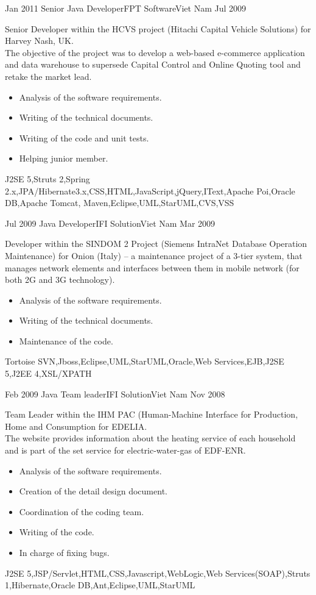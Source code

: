\begin{experiences}
\experience
  {Jan 2011}  {Senior Java Developer}{FPT Software}{Viet Nam}
  {Jul 2009}   {
Senior Developer within the HCVS project (Hitachi Capital Vehicle Solutions) for Harvey Nash, UK.\\
The objective of the project was to develop a web-based e-commerce application and data warehouse to supersede Capital Control and Online Quoting tool and retake the market lead.
	\begin{itemize}
        \item Analysis of the software requirements.       
        \item Writing of the technical documents.   
        \item Writing of the code and unit tests.
        \item Helping junior member.
	\end{itemize}
}
{J2SE 5,Struts 2,Spring 2.x,JPA/Hibernate3.x,CSS,HTML,JavaScript,jQuery,IText,Apache Poi,Oracle DB,Apache Tomcat, Maven,Eclipse,UML,StarUML,CVS,VSS}
\emptySeparator

\experience
  {Jul 2009}  {Java Developer}{IFI Solution}{Viet Nam}
  {Mar 2009}   {
Developer within the SINDOM 2 Project (Siemens IntraNet Database Operation Maintenance) for Onion (Italy) – a maintenance project of a 3-tier system, that manages network elements and interfaces between them in mobile network (for both 2G and 3G technology).
	\begin{itemize}
        \item Analysis of the software requirements.       
        \item Writing of the technical documents.   
        \item Maintenance of the code.        
	\end{itemize}
}
{Tortoise SVN,Jboss,Eclipse,UML,StarUML,Oracle,Web Services,EJB,J2SE 5,J2EE 4,XSL/XPATH}
\emptySeparator

\experience
  {Feb 2009}  {Java Team leader}{IFI Solution}{Viet Nam}
  {Nov 2008}   {
Team Leader within the IHM PAC (Human-Machine Interface for Production, Home and Consumption for EDELIA.\\
The website provides information about the heating service of each household and is part of the set service for electric-water-gas of EDF-ENR.
	\begin{itemize}
        \item Analysis of the software requirements.       
        \item Creation of the detail design document.   
        \item Coordination of the coding team.
        \item Writing of the code.
        \item In charge of fixing bugs.
	\end{itemize}
}
{J2SE 5,JSP/Servlet,HTML,CSS,Javascript,WebLogic,Web Services(SOAP),Struts 1,Hibernate,Oracle DB,Ant,Eclipse,UML,StarUML}
\emptySeparator


\end{experiences}
